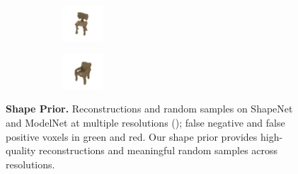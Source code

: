 \begin{figure}[tp]
{\begin{subfigure}[t]{0.5\textwidth}
\begin{subfigure}[t]{0.15\textwidth}
	    \end{subfigure}
	    \begin{subfigure}[t]{0.15\textwidth}
   	    	\vspace{0px}\centering
   	       	\includegraphics[width=1.5cm,trim={\cropleft cm \croplower cm \cropright cm \cropupper cm},clip]{gexp_clean_chair_high_10_wide_d_prior_3_3_random_results_0}
	    \end{subfigure}
	    \begin{subfigure}[t]{0.15\textwidth}
   	    	\vspace{0px}\centering
   	       	\includegraphics[width=1.5cm,trim={\cropleft cm \croplower cm \cropright cm \cropupper cm},clip]{gexp_clean_chair_high_10_wide_d_prior_3_3_random_results_3}
	    \end{subfigure}
    \end{subfigure}
    }

    \vspace*{-\figskipcaption px}
    \caption{{\bf \DVAE Shape Prior.} Reconstructions and random samples on ShapeNet and ModelNet at multiple resolutions (\cf {}); false negative and false positive voxels in {\color{rgreen}green} and {\color{rred}red}. Our \DVAE shape prior provides high-quality reconstructions and meaningful random samples across resolutions.}
    \label{fig:results-shape-prior}
    \vspace*{-\figskipbelow px}
\end{figure}